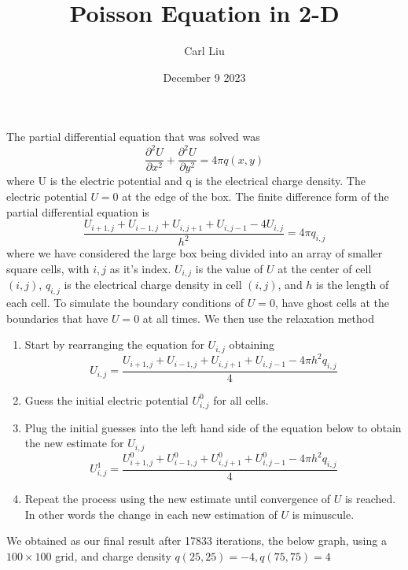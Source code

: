 \documentclass{article}
\begin{document}
\title{Poisson Equation in 2-D}
\author{Carl Liu}
\date{December 9 2023}
\maketitle
\newpage

The partial differential equation that was solved was 
\[\frac{\partial^2 U}{\partial x^2} +\frac{\partial^2 U}{\partial y^2} = 4\pi q(x,y)\] 
where U is the electric potential and q is the electrical charge density. The electric potential $ U= 0$ at the edge of the box. The finite difference form of the partial differential equation is 
\[\frac{U_{i+1,j} + U_{i-1,j} + U_{i,j+1} + U_{i,j-1} - 4U_{i,j}}{h^2}=4\pi q_{i,j}\]
where we have considered the large box being divided into an array of smaller  square cells, with $i,j$ as it's index. $U_{i,j}$ is the value of $U$ at the center of cell $(i,j)$, $q_{i,j}$ is the electrical charge density in cell $(i,j)$, and $h$ is the length of each cell. To simulate the boundary conditions of $U=0$, have ghost cells at the boundaries that have $U=0$ at all times. We then use the relaxation method 
\begin{enumerate}
    \item Start by rearranging the equation for $U_{i,j}$ obtaining
    \[U_{i,j} =\frac{U_{i+1,j} + U_{i-1,j} + U_{i,j+1} +U_{i,j-1}-4\pi h^2q_{i,j}}{4} \]
    \item Guess the initial electric potential $U_{i,j}^0$ for all cells. 
    \item Plug the initial guesses into the left hand side of the equation below to obtain the new estimate for $U_{i,j}$
    \[U_{i,j}^1 =\frac{U_{i+1,j}^0 + U_{i-1,j}^0 + U_{i,j+1}^0 +U_{i,j-1}^0-4\pi h^2q_{i,j}}{4} \]
    \item Repeat the process using the new estimate until convergence of $U$ is reached. In other words the change in each new estimation of $U$ is minuscule.
\end{enumerate}
We obtained as our final result after 17833 iterations, the below graph, using a $100\times 100$ grid, and charge density $q(25,25) = -4,  q(75,75) = 4$
\begin{center}
\end{center}
\end{document}
